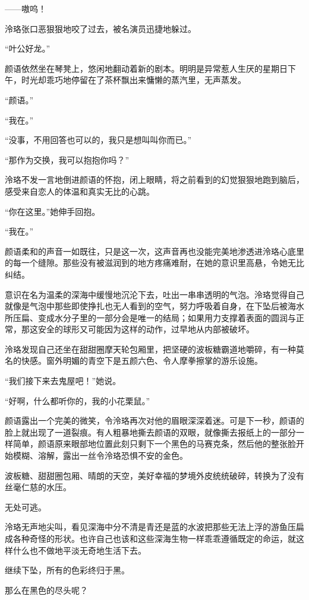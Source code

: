 \documentclass[UTF8, scheme = chinese, openany]{ctexbook}
\begin{document}
——嗷呜！

泠珞张口恶狠狠地咬了过去，被名演员迅捷地躲过。

“叶公好龙。”

颜语依然坐在琴凳上，悠闲地翻动着新的剧本。明明是异常惹人生厌的星期日下午，时光却乖巧地停留在了茶杯飘出来慵懒的蒸汽里，无声蒸发。

“颜语。”

“我在。”

“没事，不用回答也可以的，我只是想叫叫你而已。”

“那作为交换，我可以抱抱你吗？”

泠珞不发一言地倒进颜语的怀抱，闭上眼睛，将之前看到的幻觉狠狠地跑到脑后，感受来自恋人的体温和真实无比的心跳。

“你在这里。”她伸手回抱。

“我在。”

颜语柔和的声音一如既往，只是这一次，这声音再也没能完美地渗透进泠珞心底里的每一个缝隙。那些没有被滋润到的地方疼痛难耐，在她的意识里高悬，令她无比纠结。

\vspace{1.5em}

意识在名为温柔的深海中缓慢地沉沦下去，吐出一串串透明的气泡。泠珞觉得自己就像是气泡中那些即使挣扎也无人看到的空气，努力呼吸着自身，在下坠后被海水所压扁、变成水分子里的一部分会是唯一的结局；如果用力支撑着表面的圆润与正常，那这安全的球形又可能因为这样的动作，过早地从内部被破坏。

泠珞发现自己还坐在甜甜圈摩天轮包厢里，把坚硬的波板糖霸道地嚼碎，有一种莫名的快感。窗外明媚的青空下是五颜六色、令人摩拳擦掌的游乐设施。

“我们接下来去鬼屋吧！”她说。

“好啊，什么都听你的，我的小花栗鼠。”

颜语露出一个完美的微笑，令泠珞再次对他的眉眼深深着迷。可是下一秒，颜语的脸上就出现了一道裂痕。有人粗暴地撕去颜语的双眼，就像撕去报纸上的一部分一样简单，颜语原来眼部地位置此刻只剩下一个黑色的马赛克条，然后他的整张脸开始模糊、溶解，露出一丝令泠珞恐惧不安的金色。

波板糖、甜甜圈包厢、晴朗的天空，美好幸福的梦境外皮统统破碎，转换为了没有丝毫仁慈的水压。

无处可逃。

泠珞无声地尖叫，看见深海中分不清是青还是蓝的水波把那些无法上浮的游鱼压扁成各种奇怪的形状。也许自己也该和这些深海生物一样乖乖遵循既定的命运，就这样什么也不做地平淡无奇地生活下去。

继续下坠，所有的色彩终归于黑。

那么在黑色的尽头呢？
\end{document}
